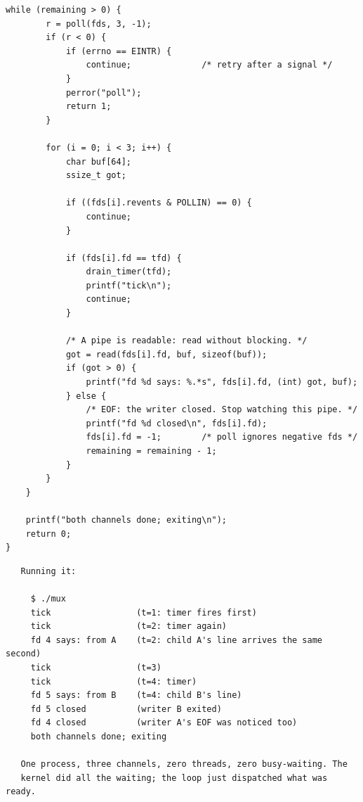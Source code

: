 \begin{lstlisting}[caption={mux.c: one loop, many channels, no thread.}]
    while (remaining > 0) {
        r = poll(fds, 3, -1);
        if (r < 0) {
            if (errno == EINTR) {
                continue;              /* retry after a signal */
            }
            perror("poll");
            return 1;
        }

        for (i = 0; i < 3; i++) {
            char buf[64];
            ssize_t got;

            if ((fds[i].revents & POLLIN) == 0) {
                continue;
            }

            if (fds[i].fd == tfd) {
                drain_timer(tfd);
                printf("tick\n");
                continue;
            }

            /* A pipe is readable: read without blocking. */
            got = read(fds[i].fd, buf, sizeof(buf));
            if (got > 0) {
                printf("fd %d says: %.*s", fds[i].fd, (int) got, buf);
            } else {
                /* EOF: the writer closed. Stop watching this pipe. */
                printf("fd %d closed\n", fds[i].fd);
                fds[i].fd = -1;        /* poll ignores negative fds */
                remaining = remaining - 1;
            }
        }
    }

    printf("both channels done; exiting\n");
    return 0;
}
\end{lstlisting}

\begin{verbatim}
   Running it:

     $ ./mux
     tick                 (t=1: timer fires first)
     tick                 (t=2: timer again)
     fd 4 says: from A    (t=2: child A's line arrives the same second)
     tick                 (t=3)
     tick                 (t=4: timer)
     fd 5 says: from B    (t=4: child B's line)
     fd 5 closed          (writer B exited)
     fd 4 closed          (writer A's EOF was noticed too)
     both channels done; exiting

   One process, three channels, zero threads, zero busy-waiting. The
   kernel did all the waiting; the loop just dispatched what was ready.
\end{verbatim}

